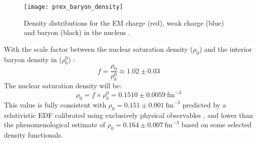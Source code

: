 \begin{figure}[!h]
    \centering
    \texttt{[image: prex\_baryon\_density]}
    \caption{Density distributions for the EM charge (red), weak charge (blue) and
    baryon (black) in the \Pb nucleus \cite{PhysRevLett.126.172502}.}
    \label{fig:saturation_density}
\end{figure}

With the scale factor between the nuclear saturation density ($\rho_0$) and the interior
baryon density in \Pb ($\rho^0_b$) \cite{PhysRevC.102.044321}:
\begin{equation}
    f = \frac{\rho_0}{\rho^0_b} \approx 1.02 \pm 0.03
\end{equation}
The nuclear saturation density will be:
\begin{equation}
    \rho_0 = f \times \rho_b^0 = 0.1510 \pm 0.0059 \ \mathrm{fm}^{-3}
\end{equation}
This value is fully consistent with $\rho_0 = 0.151 \pm 0.001 \ \mathrm{fm}^{-3}$ predicted
by a relativistic EDF calibrated using exclusively physical observables \cite{PhysRevC.90.044305},
and lower than the phenomenological estimate of $\rho_0 = 0.164 \pm 0.007 \ \mathrm{fm}^{-3}$ \cite{PhysRevLett.122.042501}
based on some selected density functionals.


